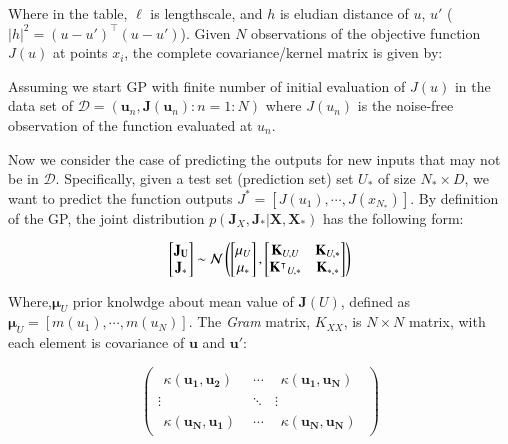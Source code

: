 \documentclass[]{elsarticle} %
\begin{document}
Where in the table, \(\ell\) is lengthscale, and \(h\) is eludian distance of \(u\), \(u'\) (\(|h|^2=(u-u')^\intercal(u-u')\)). Given \(N\) observations of the objective function \(J(u)\) at points \(x_i\), the complete covariance/kernel matrix is given by:

Assuming we start GP with finite number of initial evaluation of \(J(u)\) in the data set of \(\mathcal{D}=(\mathbf{u}_n,\mathbf{J}(\mathbf{u}_n): n=1:N)\) where \(J(u_n)\) is the noise-free observation of the function evaluated at \(u_n\).

Now we consider the case of predicting the outputs for new inputs that may not be in \(\mathcal{D}\). Specifically, given a test set (prediction set) set \(U_*\) of size \(N_* \times D\), we want to predict the function outputs \(J^* = [J(u_1),\cdots, J(x_{N_*})]\). By definition of the GP, the joint distribution \(p(\mathbf{J}_{X}, \mathbf{J}_*| \mathbf{X}, \mathbf{X_*})\) has the following form:

\begin{equation}
\begin{bmatrix}  {\bf {J}_U}  \\  {{\bf J}_*} \end{bmatrix} \sim \mathcal{N} \begin{pmatrix} \begin{bmatrix}  {{\bf \mu}_U}  \\  {{\bf \mu}_*} \end{bmatrix},\begin{bmatrix} {{\bf K}_{U,U}}  & {{\bf
K}_{U,*}}  \\  {{\bf \mathbf{K}^\intercal}_{U,*}} & {{\bf K}_{*,*} } \end{bmatrix}\end{pmatrix}
\label{eq:gp-model-mat}
\end{equation}

Where,\(\mathbf{\mu}_U\) prior knolwdge about mean value of \(\mathbf{J}(U)\), defined as \(\mathbf{\mu}_U=[m(u_1),\cdots,m(u_N)]\). The \emph{Gram} matrix, \(K_{XX}\), is \(N \times N\) matrix, with each element is covariance of \(\mathbf{u}\) and \(\mathbf{u'}\):

\begin{equation}
\left (
\begin{array}{ccc}
\begin{array}{l}
\kappa(\mathbf{u_1},\mathbf{u_2})
\end{array}
& \cdots & 
\begin{array}{l}
\kappa(\mathbf{u_1},\mathbf{u_N})
\end{array} \\
\vdots & \ddots & \vdots\\
\begin{array}{l}
\kappa(\mathbf{u_N},\mathbf{u_1})
\end{array} &
\cdots & 
\begin{array}{l}
\kappa(\mathbf{u_N},\mathbf{u_N})
\end{array} 
\end{array}
\right )
\label{eq:kernel_struct}
\end{equation}
\end{document}
